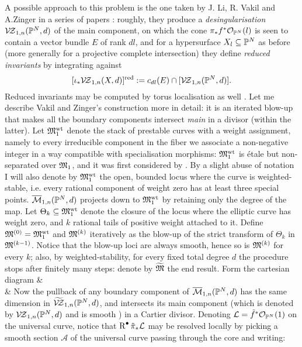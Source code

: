 A possible approach to this problem is the one taken by J. Li, R. Vakil and A.Zinger in a series of papers \cites{zsharp,zstructure,redgone,LZ,lz2,zingerstvsred,VZpreview,VZ}: roughly, they produce a \emph{desingularisation} $\mathcal{V\!Z}_{1,n}(\mathbb P^N,d)$ of the main component, on which the cone $\pi_*f^*\mathcal{O}_{\mathbb P^N}(l)$ is seen to contain a vector bundle $E$ of rank $dl$, and for a hypersurface $X_l\subseteq \mathbb P^N$ as before (more generally for a projective complete intersection) they define \emph{reduced invariants} by integrating against
\[[\iota_* \mathcal{V\!Z}_{1,n}(X,d)]^{\operatorname{red}}:= c_{dl}(E)\cap [\mathcal{V\!Z}_{1,n}(\mathbb P^N,d)].\]
Reduced invariants may be computed by torus localisation as well \cite{Zinger-CYhyp,APopa}. Let me describe Vakil and Zinger's construction more in detail: it is an iterated blow-up that makes all the boundary components intersect \emph{main} in a divisor (within the latter). Let $\mathfrak M_1^{\textrm{wt}}$ denote the stack of prestable curves with a weight assignment, namely to every irreducible component in the fiber we associate a non-negative integer in a way compatible with specialisation morphisms: $\mathfrak M_1^{\textrm{wt}}$ is \'etale but non-separated over $\mathfrak M_1$, and it was first considered by \cite{Costello}. By a slight abuse of notation I will also denote by $\mathfrak M_1^{\textrm{wt}}$ the open, bounded locus where the curve is weighted-stable, i.e. every rational component of weight zero has at least three special points. $\overline{\mathcal{M}}_{1,n}(\mathbb P^N,d)$ projects down to $\mathfrak M_1^{\textrm{wt}}$ by retaining only the degree of the map. Let $\Theta_k\subseteq \mathfrak M_1^{\textrm{wt}}$ denote the closure of the locus where the elliptic curve has weight zero, and $k$ rational tails of positive weight attached to it. Define $\mathfrak M^{(0)}=\mathfrak M_1^{\textrm{wt}}$ and $\mathfrak M^{(k)}$ iteratively as the blow-up of the strict transform of $\Theta_k$ in $\mathfrak M^{(k-1)}$. Notice that the blow-up loci are always smooth, hence so is $\mathfrak M^{(k)}$ for every $k$; also, by weighted-stability, for every fixed total degree $d$ the procedure stops after finitely many steps: denote by $\widetilde{\mathfrak M}$ the end result. Form the cartesian diagram
\bcd
{}\ar[d]\ar[r] & \ar[d] \\
\widetilde{\MM}\ar[r] & \Mwt
\ecd
Now the pullback of any boundary component of $\overline{\mathcal{M}}_{1,n}(\mathbb P^N,d)$ has the same dimension in $\widetilde{\mathcal{V\!Z}}_{1,n}(\mathbb P^N,d)$, and intersects its main component (which is denoted by $\mathcal{V\!Z}_{1,n}(\mathbb P^N,d)$ and is smooth \cite[Theorem 1.1(1)]{VZ}\cite[Theorem 2.9]{HL}) in a Cartier divisor. Denoting $\mathcal L=\tilde f^*\mathcal{O}_{\mathbb P^N}(1)$ on the universal curve, notice that $\operatorname{R}^{\bullet}\tilde{\pi}_*\mathcal L$ may be resolved locally by picking a smooth section $\mathcal A$ of the universal curve passing through the core and writing:
